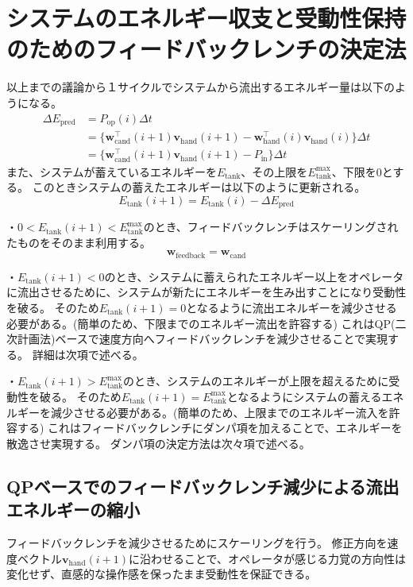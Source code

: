 \documentclass[uplatex]{jsarticle}
\begin{document}
\section{システムのエネルギー収支と受動性保持のためのフィードバックレンチの決定法}
以上までの議論から１サイクルでシステムから流出するエネルギー量は以下のようになる。
\begin{equation}
\begin{split}
  \Delta E_{\text{pred}} &= P_{\text{op}}(i) \Delta t \\
  &= \{ \bm{w}_{\text{cand}}^\top(i+1) \bm{v}_{\text{hand}}(i+1) - \bm{w}_{\text{hand}}^\top(i) \bm{v}_{\text{hand}}(i) \} \Delta t \\
  &= \{ \bm{w}_{\text{cand}}^\top(i+1) \bm{v}_{\text{hand}}(i+1) - P_{\text{in}} \} \Delta t
  \label{eq:energy_flow}
\end{split}
\end{equation}
また、システムが蓄えているエネルギーを$E_{\text{tank}}$、その上限を$E_{\text{tank}}^{\text{max}}$、下限を$0$とする。
このときシステムの蓄えたエネルギーは以下のように更新される。
\begin{equation}
  E_{\text{tank}}(i+1) = E_{\text{tank}}(i) - \Delta E_{\text{pred}}
\end{equation}

・$0 < E_{\text{tank}}(i+1) < E_{\text{tank}}^{\text{max}}$のとき、フィードバックレンチはスケーリングされたものをそのまま利用する。
\begin{equation}
  \bm{w}_{\text{feedback}} = \bm{w}_{\text{cand}}
\end{equation}

・$E_{\text{tank}}(i+1) < 0$のとき、システムに蓄えられたエネルギー以上をオペレータに流出させるために、システムが新たにエネルギーを生み出すことになり受動性を破る。
そのため$E_{\text{tank}}(i+1) = 0$となるように流出エネルギーを減少させる必要がある。(簡単のため、下限までのエネルギー流出を許容する)
これはQP(二次計画法)ベースで速度方向へフィードバックレンチを減少させることで実現する。
詳細は次項で述べる。

・$E_{\text{tank}}(i+1) > E_{\text{tank}}^{\text{max}}$のとき、システムのエネルギーが上限を超えるために受動性を破る。
そのため$E_{\text{tank}}(i+1) = E_{\text{tank}}^{\text{max}}$となるようにシステムの蓄えるエネルギーを減少させる必要がある。(簡単のため、上限までのエネルギー流入を許容する)
これはフィードバックレンチにダンパ項を加えることで、エネルギーを散逸させ実現する。
ダンパ項の決定方法は次々項で述べる。

\subsection{QPベースでのフィードバックレンチ減少による流出エネルギーの縮小}
フィードバックレンチを減少させるためにスケーリングを行う。
修正方向を速度ベクトル$\bm{v}_{\text{hand}}(i+1)$に沿わせることで、オペレータが感じる力覚の方向性は変化せず、直感的な操作感を保ったまま受動性を保証できる。  
\end{document}
